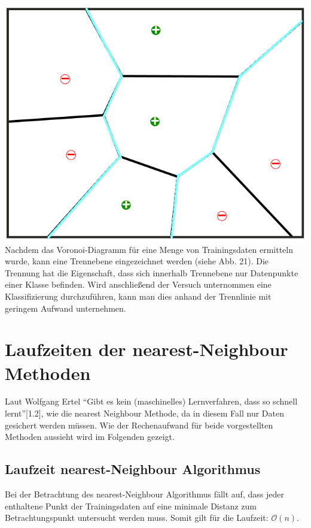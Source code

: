 \documentclass[a4paper]{scrartcl}
\begin{document}
\begin{multicols}{2}
                        \includegraphics[width=\linewidth]{vor3.png}
                        Nachdem das Voronoi-Diagramm für eine Menge von Trainingsdaten ermitteln wurde, kann eine Trennebene eingezeichnet werden (siehe Abb. 21). Die Trennung hat die Eigenschaft, dass sich innerhalb Trennebene nur Datenpunkte einer Klasse befinden. Wird anschließend der Versuch unternommen eine Klassifizierung durchzuführen, kann man dies anhand der Trennlinie mit geringem Aufwand unternehmen.
                         
                        \section{Laufzeiten der nearest-Neighbour Methoden}
                        Laut Wolfgang Ertel “Gibt es kein (maschinelles) Lernverfahren, dass so schnell lernt”[1.2], wie die nearest Neighbour Methode, da in diesem Fall nur Daten gesichert werden müssen. Wie der Rechenaufwand für beide vorgestellten Methoden aussieht wird im Folgenden gezeigt.
                        \subsection{Laufzeit nearest-Neighbour Algorithmus}
                        Bei der Betrachtung des nearest-Neighbour Algorithmus fällt auf, dass jeder enthaltene Punkt der Trainingsdaten auf eine minimale Distanz zum Betrachtungspunkt untersucht werden muss. Somit gilt für die Laufzeit:
                        $\mathcal{O}(n)$.   

\end{multicols}
\end{document}
